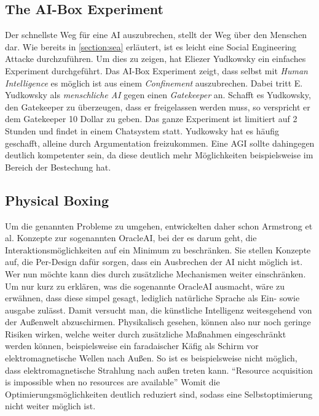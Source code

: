         \subsection{The AI-Box Experiment}
        Der schnellste Weg für eine AI auszubrechen, stellt der Weg über den Menschen dar.\cite[s. 306]{armstrongforthcoming}
        Wie bereits in \ref{section:sea} erläutert, ist es leicht eine Social Engineering Attacke durchzuführen. Um dies
        zu zeigen, hat Eliezer Yudkowsky ein einfaches Experiment durchgeführt. Das AI-Box Experiment zeigt, dass selbst
        mit \textit{Human Intelligence} es möglich ist aus einem \textit{Confinement} auszubrechen. Dabei tritt E.
        Yudkowsky als \textit{menschliche AI} gegen einen \textit{Gatekeeper} an. Schafft es Yudkowsky, den Gatekeeper
        zu überzeugen, dass er freigelassen werden muss, so verspricht er dem Gatekeeper 10 Dollar zu geben. Das ganze
        Experiment ist limitiert auf 2 Stunden und findet in einem Chatsystem statt. Yudkowsky hat es häufig geschafft,
        alleine durch Argumentation freizukommen. Eine AGI sollte dahingegen deutlich kompetenter sein, da diese deutlich
        mehr Möglichkeiten beispielsweise im Bereich der Bestechung hat.

        \subsection{Physical Boxing}

        Um die genannten Probleme zu umgehen, entwickelten daher schon Armstrong et al. Konzepte zur sogenannten OracleAI,
        bei der es darum geht, die Interaktionsmöglichkeiten auf ein Minimum zu beschränken.\cite{armstrongforthcoming}
        Sie stellen Konzepte auf, die Per-Design dafür sorgen, dass ein Ausbrechen der AI nicht möglich ist. Wer nun möchte
        kann dies durch zusätzliche Mechanismen weiter einschränken. Um nur kurz zu erklären, was die sogenannte OracleAI
        ausmacht, wäre zu erwähnen, dass diese simpel gesagt, lediglich natürliche Sprache als Ein- sowie ausgabe zulässt.
        Damit versucht man, die künstliche Intelligenz weitesgehend von der Außenwelt abzuschirmen. Physikalisch gesehen,
        können also nur noch geringe Risiken wirken, welche weiter durch zusätzliche Maßnahmen eingeschränkt werden können,
        beispielsweise ein faradaischer Käfig als Schirm vor elektromagnetische Wellen nach Außen. \cite[s. 308]{armstrongforthcoming}
        So ist es beispielsweise nicht möglich, dass elektromagnetische Strahlung nach außen treten kann.
        ``Resource acquisition is impossible when no resources are available'' \cite[s. 4]{ebhardt2018threat} Womit die
        Optimierungsmöglichkeiten deutlich reduziert sind, sodass eine Selbstoptimierung nicht weiter möglich ist.

